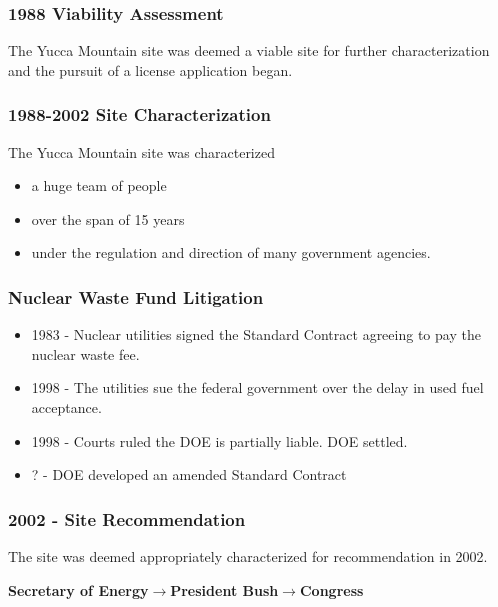 
\begin{frame}[ctb!]
    \frametitle{1988 Viability Assessment}
    The Yucca Mountain site was deemed a viable site for further 
    characterization and the pursuit of a license application began. 

  \end{frame}

\begin{frame}[ctb!]
    \frametitle{1988-2002 Site Characterization}
    The Yucca Mountain site was characterized 
    \begin{itemize}
      \item a huge team of people 
      \item over the span of 15 years
      \item under the regulation and direction of many government agencies.
    \end{itemize}
  \end{frame}

\begin{frame}[ctb!]
\frametitle{Nuclear Waste Fund Litigation}
    \begin{itemize}
    \item 1983 - Nuclear utilities signed the Standard Contract agreeing to pay the nuclear waste fee.
    \item 1998 - The utilities sue the federal government over the delay in used fuel acceptance.
    \item 1998 - Courts ruled the DOE is partially liable. DOE settled. 
    \item ? - DOE developed an amended Standard Contract
  \end{itemize}
\end{frame}

\begin{frame}[ctb!]
    \frametitle{2002 - Site Recommendation}
    The site was deemed appropriately characterized for recommendation in 2002.

    \vspace{3cm}
      \textbf{Secretary of Energy}$\longrightarrow$\textbf{President 
      Bush}$\longrightarrow$\textbf{Congress}
  \end{frame}


